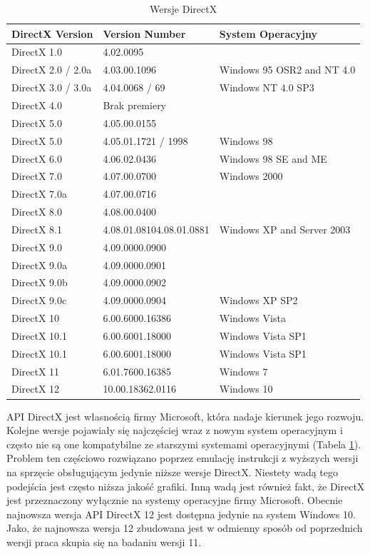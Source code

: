 \documentclass[archive]{mgr}
\begin{document}
\begin{table}[!h]

    \centering 
    \caption{Wersje DirectX}
    		\label{DirectX Versions}
    \vspace{2mm} 
\begin{tabular}{|l|l|l|}
\hline

\textbf{DirectX Version}&	\textbf{Version Number}&	\textbf{System Operacyjny}\\ \hline
DirectX 1.0    &4.02.0095&\\ \hline
DirectX 2.0 / 2.0a&	4.03.00.1096&	Windows 95 OSR2 and NT 4.0\\ \hline
DirectX 3.0 / 3.0a&	4.04.0068 / 69&	Windows NT 4.0 SP3\\ \hline
DirectX 4.0&	Brak premiery	&\\ \hline
DirectX 5.0&	4.05.00.0155	&\\ \hline
DirectX 5.0&	4.05.01.1721 / 1998&	Windows 98\\ \hline
DirectX 6.0&	4.06.02.0436&	Windows 98 SE and ME\\ \hline
DirectX 7.0&	4.07.00.0700	&Windows 2000\\ \hline
DirectX 7.0a&	4.07.00.0716	&\\ \hline
DirectX 8.0&	4.08.00.0400	&\\ \hline
DirectX 8.1&	4.08.01.08104.08.01.0881&	Windows XP and Server 2003\\ \hline
DirectX 9.0&	4.09.0000.0900	&\\ \hline
DirectX 9.0a&	4.09.0000.0901	&\\ \hline
DirectX 9.0b&	4.09.0000.0902	&\\ \hline
DirectX 9.0c&	4.09.0000.0904&	Windows XP SP2\\ \hline
DirectX 10&	6.00.6000.16386&	Windows Vista\\ \hline
DirectX 10.1&	6.00.6001.18000&	Windows Vista SP1\\ \hline
DirectX 10.1&	6.00.6001.18000&	Windows Vista SP1\\ \hline
DirectX 11&		6.01.7600.16385&	Windows 7\\ \hline
DirectX 12&		10.00.18362.0116&	Windows 10\\ \hline

\end{tabular}
\end{table}
\newpage
API DirectX jest własnością firmy Microsoft, która nadaje kierunek jego rozwoju. Kolejne wersje pojawiały się najczęściej wraz z nowym system operacyjnym i często nie są one kompatybilne ze starszymi systemami operacyjnymi (Tabela \ref{DirectX Versions}). Problem ten częściowo rozwiązano poprzez emulację instrukcji z wyższych wersji na sprzęcie obsługującym jedynie niższe wersje DirectX. Niestety wadą tego podejścia jest często niższa jakość grafiki. Inną wadą jest również fakt, że DirectX jest przeznaczony wyłącznie na systemy operacyjne firmy Microsoft. Obecnie najnowsza wersja API DirectX 12 jest dostępna jedynie na system Windows 10. Jako, że najnowsza wersja 12 zbudowana jest w odmienny sposób od poprzednich wersji praca skupia się na badaniu wersji 11. \\
\end{document}
